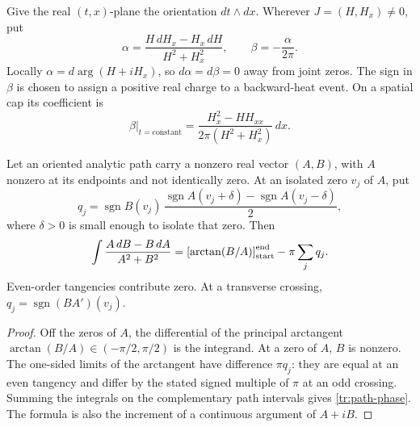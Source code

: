 Give the real $(t,x)$-plane the orientation $dt\wedge dx$.  Wherever
$J=(H,H_x)\ne0$, put
\begin{equation}\label{tr:angular-form}
 \alpha=\frac{H\,dH_x-H_x\,dH}{H^2+H_x^2},\qquad
 \beta=-\frac{\alpha}{2\pi}.
\end{equation}
Locally $\alpha=d\arg(H+iH_x)$, so $d\alpha=d\beta=0$ away from joint
zeros.  The sign in $\beta$ is chosen to assign a positive real charge
to a backward-heat event.  On a spatial cap its coefficient is
\begin{equation}\label{tr:cap-density}
 \beta\big|_{t=\mathrm{constant}}
      =\frac{H_x^2-HH_{xx}}{2\pi(H^2+H_x^2)}\,dx.
\end{equation}

\begin{lemma}\label{tr:phase-jumps}
Let an oriented analytic path carry a nonzero real vector $(A,B)$, with
$A$ nonzero at its endpoints and not identically zero.  At an isolated
zero $v_j$ of $A$, put
\[
 q_j=\operatorname{sgn}B(v_j)\,
 \frac{\operatorname{sgn}A(v_j+\delta)
          -\operatorname{sgn}A(v_j-\delta)}2,
\]
where $\delta>0$ is small enough to isolate that zero.  Then
\begin{equation}\label{tr:path-phase}
 \int\frac{A\,dB-B\,dA}{A^2+B^2}
   =\left[\arctan(B/A)\right]_{\rm start}^{\rm end}
                       -\pi\sum_jq_j.
\end{equation}
Even-order tangencies contribute zero.  At a transverse crossing,
$q_j=\operatorname{sgn}(B A')(v_j)$.
\end{lemma}

\begin{proof}
Off the zeros of $A$, the differential of the principal arctangent
$\arctan(B/A)\in(-\pi/2,\pi/2)$ is the integrand.  At a zero of $A$,
$B$ is nonzero.  The one-sided limits of the arctangent have difference
$\pi q_j$: they are equal at an even tangency and differ by the stated
signed multiple of $\pi$ at an odd crossing.  Summing the integrals on
the complementary path intervals gives \eqref{tr:path-phase}.  The
formula is also the increment of a continuous argument of $A+iB$.
\end{proof}


